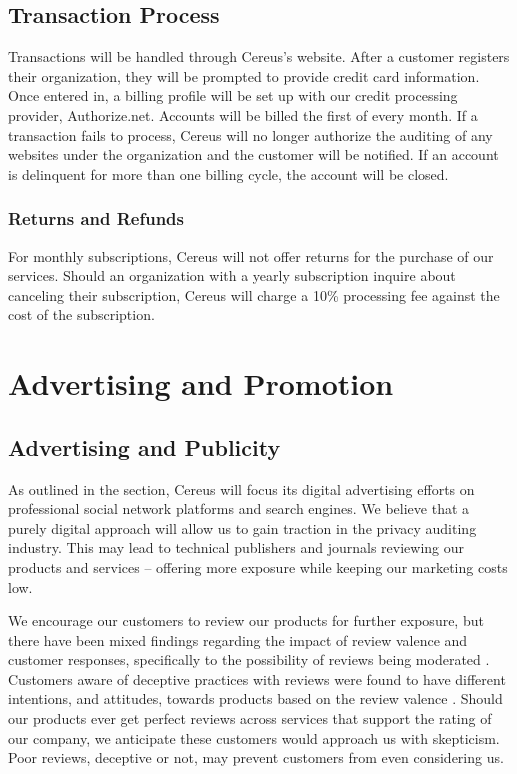 \subsection{Transaction Process} \label{transaction.process}

Transactions will be handled through Cereus's website. After a customer registers their organization, they will be prompted to provide credit card information. Once entered in, a billing profile will be set up with our credit processing provider, Authorize.net. Accounts will be billed the first of every month. If a transaction fails to process, Cereus will no longer authorize the auditing of any websites under the organization and the customer will be notified. If an account is delinquent for more than one billing cycle, the account will be closed.

\subsubsection{Returns and Refunds}

For monthly subscriptions, Cereus will not offer returns for the purchase of our services. Should an organization with a yearly subscription inquire about canceling their subscription, Cereus will charge a 10\% processing fee against the cost of the subscription.



\section{Advertising and Promotion} \label{marketing.ad.promo}

\subsection{Advertising and Publicity}

As outlined in the  section, Cereus will focus its digital advertising efforts on professional social network platforms and search engines. We believe that a purely digital approach will allow us to gain traction in the privacy auditing industry. This may lead to technical publishers and journals reviewing our products and services -- offering more exposure while keeping our marketing costs low.

We encourage our customers to review our products for further exposure, but there have been mixed findings regarding the impact of review valence and customer responses, specifically to the possibility of reviews being moderated \cite{maslowska.reviews.2017}. Customers aware of deceptive practices with reviews were found to have different intentions, and attitudes, towards products based on the review valence \cite{karabas.reviews.2020}. Should our products ever get perfect reviews across services that support the rating of our company, we anticipate these customers would approach us with skepticism. Poor reviews, deceptive or not, may prevent customers from even considering us.

